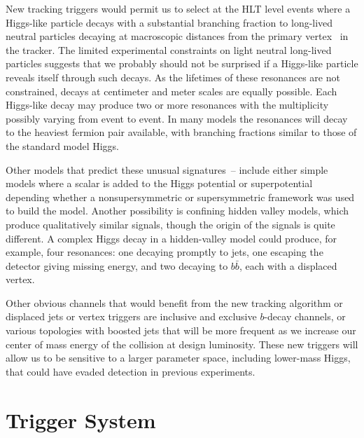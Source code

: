 \documentclass{JINST}
\begin{document}
New tracking triggers would permit us to select at the HLT level events where a Higgs-like particle decays with a substantial branching fraction to long-lived neutral particles decaying
at macroscopic distances from the primary vertex~\cite{bib:hiddenvalley} in the tracker. The limited experimental constraints on light neutral long-lived particles
suggests that we probably should not be surprised if a Higgs-like particle reveals itself  through such decays. As the lifetimes of these resonances 
are not constrained, decays at centimeter and meter scales are equally possible. Each Higgs-like decay may produce two or more resonances 
with the multiplicity possibly varying from event to event. In many models the resonances will decay to the heaviest fermion 
pair available, with branching fractions similar to those of the standard model Higgs.

Other models that predict these unusual signatures~\cite{bib:hiddenvalley}--\cite{Strassler:2006ri} include either simple models where a scalar is added to the Higgs potential or superpotential depending whether a nonsupersymmetric
or supersymmetric framework was used to build the model. Another possibility is confining hidden valley models, which produce qualitatively similar signals, though the origin of the signals is 
quite different.  A complex Higgs decay in a hidden-valley model could produce, for example, four resonances: one decaying promptly to jets,
 one escaping the detector giving missing energy, and two decaying to $b\bar{b}$, each with a displaced vertex.  

Other obvious channels that would benefit from the new tracking algorithm or displaced jets or vertex triggers are inclusive
and exclusive $b$-decay channels, or various topologies with boosted jets that will be more frequent as we increase our center of
mass energy of the collision at design luminosity. These new triggers will allow us to be sensitive to a larger  parameter space,
including lower-mass Higgs, that could have evaded detection in previous experiments.

\section{Trigger System}
%
\end{document}
